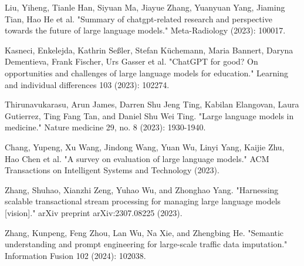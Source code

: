 \documentclass[runningheads]{llncs}
\begin{document}
\begin{thebibliography}{8}

Liu, Yiheng, Tianle Han, Siyuan Ma, Jiayue Zhang, Yuanyuan Yang, Jiaming Tian, Hao He et al. "Summary of chatgpt-related research and perspective towards the future of large language models." Meta-Radiology (2023): 100017.

Kasneci, Enkelejda, Kathrin Seßler, Stefan Küchemann, Maria Bannert, Daryna Dementieva, Frank Fischer, Urs Gasser et al. "ChatGPT for good? On opportunities and challenges of large language models for education." Learning and individual differences 103 (2023): 102274.

Thirunavukarasu, Arun James, Darren Shu Jeng Ting, Kabilan Elangovan, Laura Gutierrez, Ting Fang Tan, and Daniel Shu Wei Ting. "Large language models in medicine." Nature medicine 29, no. 8 (2023): 1930-1940.

Chang, Yupeng, Xu Wang, Jindong Wang, Yuan Wu, Linyi Yang, Kaijie Zhu, Hao Chen et al. "A survey on evaluation of large language models." ACM Transactions on Intelligent Systems and Technology (2023).

Zhang, Shuhao, Xianzhi Zeng, Yuhao Wu, and Zhonghao Yang. "Harnessing scalable transactional stream processing for managing large language models [vision]." arXiv preprint arXiv:2307.08225 (2023).

Zhang, Kunpeng, Feng Zhou, Lan Wu, Na Xie, and Zhengbing He. "Semantic understanding and prompt engineering for large-scale traffic data imputation." Information Fusion 102 (2024): 102038.


\end{thebibliography}
\end{document}
